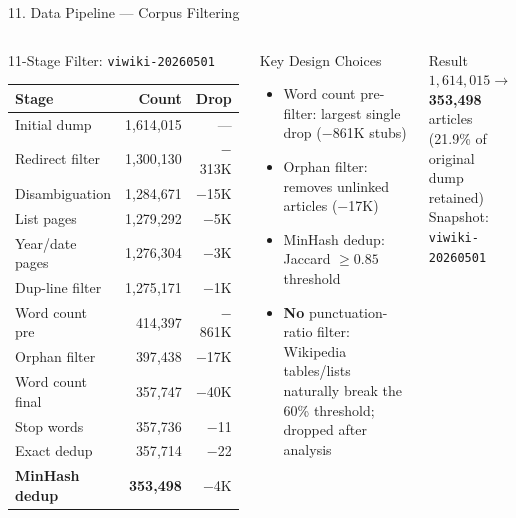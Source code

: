 \documentclass[aspectratio=169]{beamer}
\newcommand{\pos}[1]{\textcolor{positive}{#1}}
\begin{document}
\begin{frame}[shrink=15]{11. Data Pipeline — Corpus Filtering}
\begin{columns}[T]
\begin{block}{11-Stage Filter: \texttt{viwiki-20260501}}
\begin{tabular}{@{}lrr@{}}
\toprule
\textbf{Stage} & \textbf{Count} & \textbf{Drop} \\
\midrule
Initial dump        & 1{,}614{,}015 & --- \\
Redirect filter     & 1{,}300{,}130 & $-$313K \\
Disambiguation      & 1{,}284{,}671 & $-$15K \\
List pages          & 1{,}279{,}292 & $-$5K \\
Year/date pages     & 1{,}276{,}304 & $-$3K \\
Dup-line filter     & 1{,}275{,}171 & $-$1K \\
Word count pre      &   414{,}397 & $-$861K \\
Orphan filter       &   397{,}438 & $-$17K \\
Word count final    &   357{,}747 & $-$40K \\
Stop words          &   357{,}736 & $-$11 \\
Exact dedup         &   357{,}714 & $-$22 \\
\textbf{MinHash dedup} & \textbf{353{,}498} & $-$4K \\
\bottomrule
\end{tabular}
\end{block}

\begin{exampleblock}{Key Design Choices}
\begin{itemize}\scriptsize\setlength\itemsep{2pt}
  \item Word count pre-filter: largest single drop ($-$861K stubs)
  \item Orphan filter: removes unlinked articles ($-$17K)
  \item MinHash dedup: Jaccard $\geq 0.85$ threshold
  \item \textbf{No} punctuation-ratio filter: Wikipedia tables/lists naturally break the 60\% threshold; dropped after analysis
\end{itemize}
\end{exampleblock}

\begin{block}{Result}
{\small $1{,}614{,}015 \rightarrow$ \pos{\textbf{353{,}498}} articles\\
(21.9\% of original dump retained)\\
Snapshot: \texttt{viwiki-20260501}}
\end{block}
\end{columns}
\end{frame}
\end{document}
